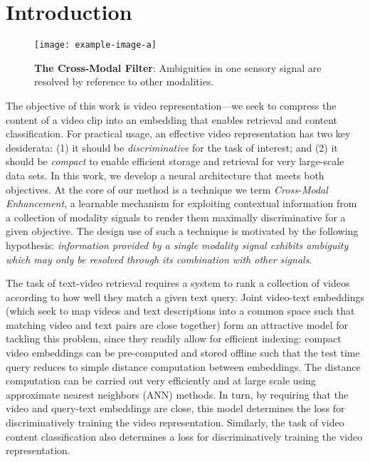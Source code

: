 \section{Introduction}


\begin{figure}
    \centering
    \texttt{[image: example-image-a]}
    \caption{\textbf{The Cross-Modal Filter}: Ambiguities in one sensory signal are resolved by reference to other modalities.}
    \label{fig:my_label}
\end{figure}


The objective of this work is video representation---we seek to
compress the content of a video clip into an embedding that enables
retrieval and content classification.  For practical usage, an
effective video representation has two key desiderata: (1) it should
be \textit{discriminative} for the task of interest; and (2) it should be
\textit{compact} to enable efficient storage and retrieval for very large-scale data sets.  In this
work, we develop a neural  architecture that meets both objectives.  At the
core of our method is a technique we term \textit{Cross-Modal
Enhancement}, a learnable mechanism for exploiting contextual
information from a collection of modality signals to render them
maximally discriminative for a given objective.  The design use of such a technique is motivated by the following hypothesis: \textit{information
provided by a single modality signal exhibits ambiguity which
may only be resolved through its combination with other 
signals}.  

The task of text-video retrieval requires a system to rank a
collection of videos according to how well they match a given text
query.  Joint video-text embeddings (which seek to map videos and text
descriptions into a common space such that matching video and text
pairs are close together) form an attractive model for tackling this
problem, since they readily allow for efficient indexing: compact
video embeddings can be pre-computed and stored offline such that the
test time query reduces to simple distance computation between
embeddings. The distance computation can be carried out very efficiently
and at large scale using approximate nearest neighbors (ANN)  methods.
In turn, by requiring that the video and query-text embeddings are close,
this model determines the loss for discriminatively training the video representation.
Similarly,  the task of video content classification also determines a loss 
for discriminatively training the video representation.


